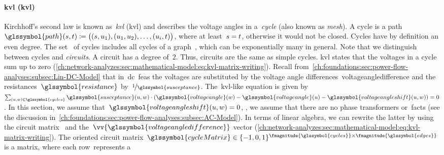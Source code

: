 \paragraph{\acrlong{kvl} (\gls{kvl})}
\label{ch:network-analyzes:sec:mathematical-model:paragraph:kvl}
% 
Kirchhoff's second law is known as~\emph{\acrlong{kvl}} (\gls{kvl}) and
describes the voltage angles in a~\emph{cycle} (also known as \emph{mesh}). A
cycle is a path~$
    \glssymbol{path}(\source,\sink) 
    \coloneqq
    \big(
        (\source,\vertexa_1), 
        (\vertexa_1,\vertexa_2), 
        \dots,
        (\vertexa_i,\sink)
    \big)
$, where at least~$s = t$, otherwise it would not be closed. Cycles
have by definition an even degree.
% 
% 
The set~ of cycles includes all cycles of a
graph~, which can be exponentially many in general. Note that
we distinguish between cycles and \emph{circuits}. A circuit has a degree
of~$2$. Thus, circuits are the same as simple cycles.
\acrlong{kvl} states that the voltages in a cycle sum up to zero
(\cref{ch:network-analyzes:sec:mathematical-model:eq:kvl-matrix-writing}).
Recall from~\cref{ch:foundations:sec:power-flow-analyses:subsec:Lin-DC-Model}
that in~\gls{dc}~\gls{feas} the voltages are substituted by the voltage angle
differences~\gls{voltageangledifference} and the
resistances~$\glssymbol{resistance}$ by~$\nicefrac{1}{\glssymbol{susceptance}}$.
The~\gls{kvl}-like equation is given
by~$
    \sum_{(\vertexa,\vertexc)\in\glssymbol{cycles}}
    \glssymbol{susceptance}(\vertexa,\vertexc)
    \cdot
    \left(
        \glssymbol{voltageangle}(\vertexc) 
        -
        \glssymbol{voltageangle}(\vertexa) 
        -
        \glssymbol{voltageangleshift}(\vertexa,\vertexc)
    \right) 
    = 
    0
$. In this section, we assume that~$
    \glssymbol{voltageangleshift}(\vertexa,\vertexc) = 0
$, \ie, we assume that there are no phase transformers or~\gls{facts} (see the
discussion in~\cref{ch:foundations:sec:power-flow-analyses:subsec:AC-Model}). In
terms of linear algebra, we can rewrite the latter by using the circuit
matrix~ and the~$\vv{\glssymbol{voltageangledifference}}$
vector
(\cref{ch:network-analyzes:sec:mathematical-model:eq:kvl-matrix-writing}).
% 
The oriented circuit
matrix~$
    \glssymbol{cycleMatrix}
    \in
    \{-1,0,1\}^{
        \fmagnitude{\glssymbol{cycles}}
        \times
        \fmagnitude{\glssymbol{edges}}
    }
$ is a matrix, where each row~\cycle represents a
